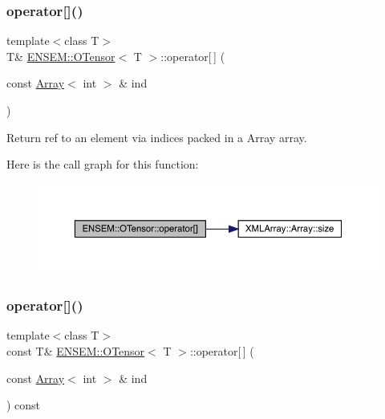 \subsubsection{\texorpdfstring{operator[]()}{operator[]()}\hspace{0.1cm}{\footnotesize\ttfamily [3/6]}}
{\footnotesize\ttfamily template$<$class T$>$ \\
T\& \mbox{\hyperlink{classENSEM_1_1OTensor}{E\+N\+S\+E\+M\+::\+O\+Tensor}}$<$ T $>$\+::operator\mbox{[}$\,$\mbox{]} (\begin{DoxyParamCaption}\item[{const \mbox{\hyperlink{classXMLArray_1_1Array}{Array}}$<$ int $>$ \&}]{ind }\end{DoxyParamCaption})\hspace{0.3cm}{\ttfamily [inline]}}



Return ref to an element via indices packed in a Array array. 

Here is the call graph for this function\+:
\nopagebreak
\begin{figure}[H]
\begin{center}
\leavevmode
\includegraphics[width=350pt]{da/d8a/classENSEM_1_1OTensor_adbfded2bb2af9d68e0a040df0d19b2d6_cgraph}
\end{center}
\end{figure}
\mbox{\label{classENSEM_1_1OTensor_aa649ae52fc364d173eb02db2fbee8172}} 
\subsubsection{\texorpdfstring{operator[]()}{operator[]()}\hspace{0.1cm}{\footnotesize\ttfamily [4/6]}}
{\footnotesize\ttfamily template$<$class T$>$ \\
const T\& \mbox{\hyperlink{classENSEM_1_1OTensor}{E\+N\+S\+E\+M\+::\+O\+Tensor}}$<$ T $>$\+::operator\mbox{[}$\,$\mbox{]} (\begin{DoxyParamCaption}\item[{const \mbox{\hyperlink{classXMLArray_1_1Array}{Array}}$<$ int $>$ \&}]{ind }\end{DoxyParamCaption}) const\hspace{0.3cm}{\ttfamily [inline]}}



